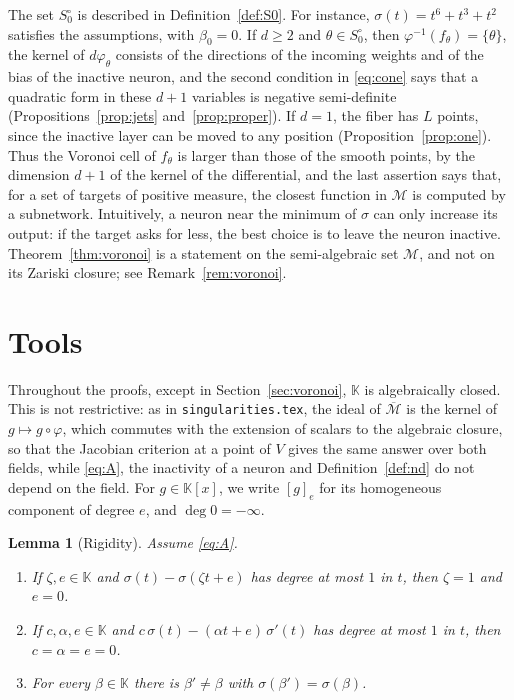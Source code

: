 \documentclass[11pt]{article}
\newtheorem{lemma}{Lemma}
\theoremstyle{definition}
\theoremstyle{remark}
\newcommand{\K}{\mathbb{K}}
\newcommand{\M}{\mathcal{M}}
\newcommand{\Mbar}{\overline{\M}}
\begin{document}
The set $S_0^\circ$ is described in Definition~\ref{def:S0}. For instance, $\sigma(t)=t^6+t^3+t^2$ satisfies the assumptions, with $\beta_0=0$. If $d\ge2$ and $\theta\in S_0^\circ$, then $\varphi^{-1}(f_\theta)=\{\theta\}$, the kernel of $d\varphi_\theta$ consists of the directions of the incoming weights and of the bias of the inactive neuron, and the second condition in \eqref{eq:cone} says that a quadratic form in these $d+1$ variables is negative semi-definite (Propositions~\ref{prop:jets} and~\ref{prop:proper}). If $d=1$, the fiber has $L$ points, since the inactive layer can be moved to any position (Proposition~\ref{prop:one}). Thus the Voronoi cell of $f_\theta$ is larger than those of the smooth points, by the dimension $d+1$ of the kernel of the differential, and the last assertion says that, for a set of targets of positive measure, the closest function in $\M$ is computed by a subnetwork. Intuitively, a neuron near the minimum of $\sigma$ can only increase its output: if the target asks for less, the best choice is to leave the neuron inactive. Theorem~\ref{thm:voronoi} is a statement on the semi-algebraic set $\M$, and not on its Zariski closure; see Remark~\ref{rem:voronoi}.

\section{Tools}

Throughout the proofs, except in Section~\ref{sec:voronoi}, $\K$ is algebraically closed. This is not restrictive: as in \texttt{singularities.tex}, the ideal of $\Mbar$ is the kernel of $g\mapsto g\circ\varphi$, which commutes with the extension of scalars to the algebraic closure, so that the Jacobian criterion at a point of $V$ gives the same answer over both fields, while \eqref{eq:A}, the inactivity of a neuron and Definition~\ref{def:nd} do not depend on the field. For $g\in\K[x]$, we write $[g]_e$ for its homogeneous component of degree $e$, and $\deg0=-\infty$.

\begin{lemma}[Rigidity]\label{lem:rigid}
Assume \eqref{eq:A}.
\begin{enumerate}[label=\textup{(\roman*)},nosep]
\item If $\zeta,e\in\K$ and $\sigma(t)-\sigma(\zeta t+e)$ has degree at most $1$ in $t$, then $\zeta=1$ and $e=0$.
\item If $c,\alpha,e\in\K$ and $c\,\sigma(t)-(\alpha t+e)\,\sigma'(t)$ has degree at most $1$ in $t$, then $c=\alpha=e=0$.
\item For every $\beta\in\K$ there is $\beta'\ne\beta$ with $\sigma(\beta')=\sigma(\beta)$.
\end{enumerate}
\end{lemma}
\end{document}
